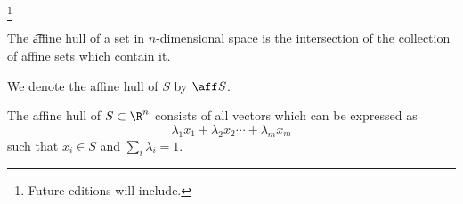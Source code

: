 
  \ifhmode\unskip\fi\footnote{
Future editions will include.
  }


The \t{affine hull} of a set in $n$-dimensional space is the intersection of the collection of affine sets which contain it.


We denote the affine hull of $S$ by $\aff S$.

\begin{prop}
The affine hull of $S \subset \R ^n$ consists of all vectors which can be expressed as
  \[
\lambda _1 x_1 + \lambda _2 x_2 \cdots + \lambda _m x_m
  \]
such that $x_i \in S$ and $\sum_i \lambda _i = 1$.
\end{prop}

\blankpage
